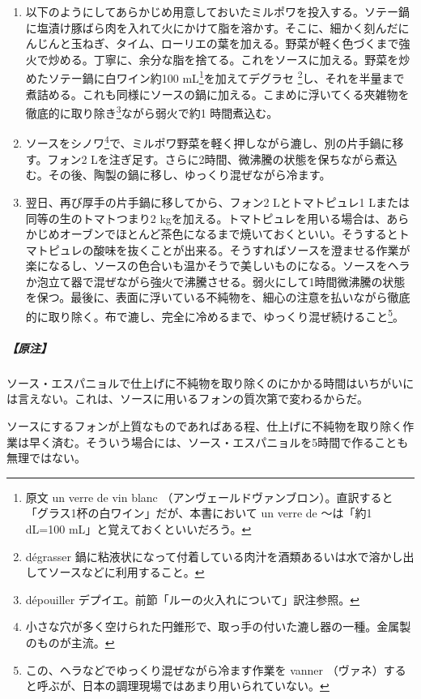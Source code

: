 \begin{recette}
\begin{enumerate}
  弱火にして\footnote{原文から直訳すると「鍋を火の脇に置く」だが、現代の調理環境では単純に「弱火にする」と解釈していい。}微沸騰の状態を保つ。
\item
  以下のようにしてあらかじめ用意しておいたミルポワを投入する。ソテー鍋に塩漬け豚ばら肉を入れて火にかけて脂を溶かす。そこに、細かく刻んだにんじんと玉ねぎ、タイム、ローリエの葉を加える。野菜が軽く色づくまで強火で炒める。丁寧に、余分な脂を捨てる。これをソースに加える。野菜を炒めたソテー鍋に白ワイン約100
  mL\footnote{原文 un verre de vin blanc
    （アンヴェールドヴァンブロン）。直訳すると「グラス1杯の白ワイン」だが、本書において
    un verre de 〜は「約1 dL=100 mL」と覚えておくといいだろう。}を加えてデグラセ
  \footnote{dégrasser
    鍋に粘液状になって付着している肉汁を酒類あるいは水で溶かし出してソースなどに利用すること。}し、それを半量まで煮詰める。これも同様にソースの鍋に加える。こまめに浮いてくる夾雑物を徹底的に取り除き\footnote{dépouiller
    デプイエ。前節「ルーの火入れについて」訳注参照。}ながら弱火で約1
  時間煮込む。
\item
  ソースをシノワ\footnote{小さな穴が多く空けられた円錐形で、取っ手の付いた漉し器の一種。金属製のものが主流。}で、ミルポワ野菜を軽く押しながら漉し、別の片手鍋に移す。フォン2
  Lを注ぎ足す。さらに2時間、微沸騰の状態を保ちながら煮込む。その後、陶製の鍋に移し、ゆっくり混ぜながら冷ます。
\item
  翌日、再び厚手の片手鍋に移してから、フォン2 Lとトマトピュレ1
  Lまたは同等の生のトマトつまり2
  kgを加える。トマトピュレを用いる場合は、あらかじめオーブンでほとんど茶色になるまで焼いておくといい。そうするとトマトピュレの酸味を抜くことが出来る。そうすればソースを澄ませる作業が楽になるし、ソースの色合いも温かそうで美しいものになる。ソースをヘラか泡立て器で混ぜながら強火で沸騰させる。弱火にして1時間微沸騰の状態を保つ。最後に、表面に浮いている不純物を、細心の注意を払いながら徹底的に取り除く。布で漉し、完全に冷めるまで、ゆっくり混ぜ続けること\footnote{この、ヘラなどでゆっくり混ぜながら冷ます作業を
    vanner
    （ヴァネ）すると呼ぶが、日本の調理現場ではあまり用いられていない。}。
\end{enumerate}

\hypertarget{nota-sauce-espagnole}{%
\subparagraph{【原注】}\label{nota-sauce-espagnole}}

ソース・エスパニョルで仕上げに不純物を取り除くのにかかる時間はいちがいには言えない。これは、ソースに用いるフォンの質次第で変わるからだ。

ソースにするフォンが上質なものであればある程、仕上げに不純物を取り除く作業は早く済む。そういう場合には、ソース・エスパニョルを5時間で作ることも無理ではない。


\end{recette}
